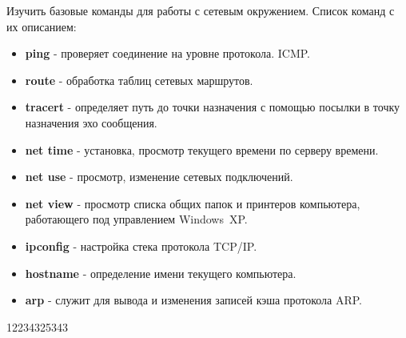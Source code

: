 \documentclass[a4paper,12pt]{article}
\begin{document}
  
  \begin{flushleft}
    Изучить базовые команды для работы с сетевым окружением.
    Список команд с их описанием:
    \begin{itemize}
     \item {\bf ping} - проверяет соединение на уровне протокола. ICMP.
     \item {\bf route} - обработка таблиц сетевых маршрутов.
     \item {\bf tracert} - определяет путь до точки назначения с помощью посылки в точку назначения эхо сообщения.
     \item {\bf net time} - установка, просмотр текущего времени по серверу времени.
     \item {\bf net use} - просмотр, изменение сетевых подключений.
     \item {\bf net view} - просмотр списка общих папок и принтеров компьютера, работающего под управлением Windows XP.
     \item {\bf ipconfig} - настройка стека протокола TCP/IP.
     \item {\bf hostname} - определение имени текущего компьютера.
     \item {\bf arp} - служит для вывода и изменения записей кэша протокола ARP.
    \end{itemize}
  \end{flushleft}
  

  \begin{flushleft}
    12234325343
  \end{flushleft}
\end{document}

